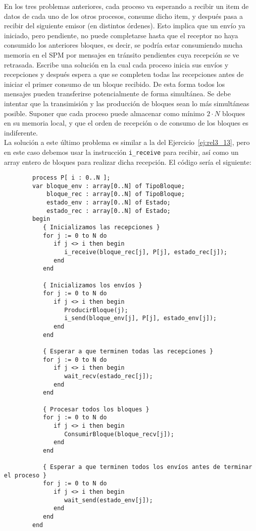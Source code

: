 \begin{ejercicio}\label{ej:rel3_14}
    En los tres problemas anteriores, cada proceso va esperando a recibir un item de datos de cada uno de los otros procesos, consume dicho item, y después pasa a recibir del siguiente emisor (en distintos órdenes). Esto implica que un envío ya iniciado, pero pendiente, no puede completarse hasta que el receptor no haya consumido los anteriores bloques, es decir, se podría estar consumiendo mucha memoria en el SPM por mensajes en tránsito pendientes cuya recepción se ve retrasada. Escribe una solución en la cual cada proceso inicia sus envíos y recepciones y después espera a que se completen todas las recepciones antes de iniciar el primer consumo de un bloque recibido. De esta forma todos los mensajes pueden transferirse potencialmente de forma simultánea. Se debe intentar que la transimisión y las producción de bloques sean lo más simultáneas posible. Suponer que cada proceso puede almacenar como mínimo $2\cdot N$ bloques en su memoria local, y que el orden de recepción o de consumo de los bloques es indiferente.\\

    La solución a este último problema es similar a la del Ejercicio~\ref{ej:rel3_13}, pero en este caso debemos usar la instrucción \verb|i_receive| para recibir, así como un array entero de bloques para realizar dicha recepción. El código sería el siguiente:
    \begin{verbatim}
        process P[ i : 0..N ];
        var bloque_env : array[0..N] of TipoBloque;
            bloque_rec : array[0..N] of TipoBloque;
            estado_env : array[0..N] of Estado;
            estado_rec : array[0..N] of Estado;
        begin
           { Inicializamos las recepciones }
           for j := 0 to N do
              if j <> i then begin
                 i_receive(bloque_rec[j], P[j], estado_rec[j]);
              end
           end

           { Inicializamos los envíos }
           for j := 0 to N do
              if j <> i then begin
                 ProducirBloque(j);
                 i_send(bloque_env[j], P[j], estado_env[j]);
              end
           end

           { Esperar a que terminen todas las recepciones }
           for j := 0 to N do
              if j <> i then begin
                 wait_recv(estado_rec[j]);
              end
           end

           { Procesar todos los bloques }
           for j := 0 to N do
              if j <> i then begin
                 ConsumirBloque(bloque_recv[j]);
              end
           end

           { Esperar a que terminen todos los envíos antes de terminar el proceso }
           for j := 0 to N do
              if j <> i then begin
                 wait_send(estado_env[j]);
              end
           end
        end
    \end{verbatim}
\end{ejercicio}